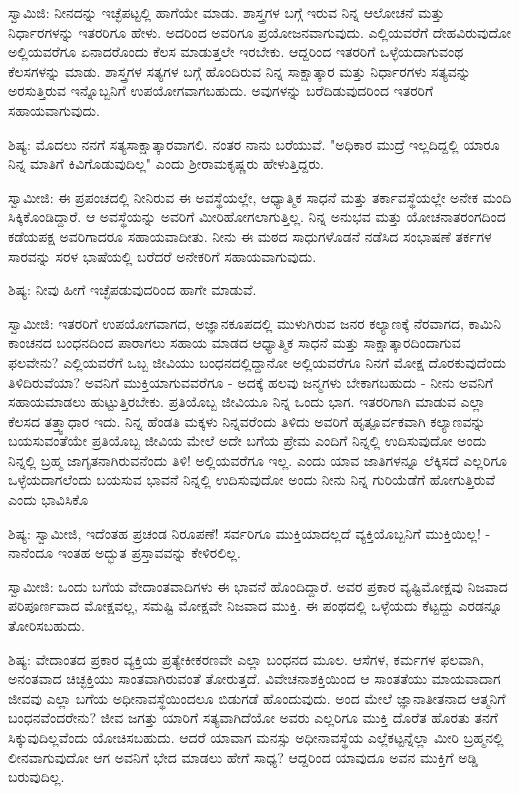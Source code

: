 ಸ್ವಾಮಿಜಿ: ನೀನದನ್ನು ಇಚ್ಛೆಪಟ್ಟಲ್ಲಿ ಹಾಗೆಯೇ ಮಾಡು. ಶಾಸ್ತ್ರಗಳ ಬಗ್ಗೆ ಇರುವ ನಿನ್ನ ಆಲೋಚನೆ ಮತ್ತು ನಿರ್ಧಾರಗಳನ್ನು ಇತರರಿಗೂ ಹೇಳು. ಅದರಿಂದ ಅವರಿಗೂ ಪ್ರಯೋಜನವಾಗುವುದು. ಎಲ್ಲಿಯವರೆಗೆ ದೇಹವಿರುವುದೋ ಅಲ್ಲಿಯವರೆಗೂ ಏನಾದರೊಂದು ಕೆಲಸ ಮಾಡುತ್ತಲೇ ಇರಬೇಕು. ಆದ್ದರಿಂದ ಇತರರಿಗೆ ಒಳ್ಳೆಯದಾಗುವಂಥ ಕೆಲಸಗಳನ್ನು ಮಾಡು. ಶಾಸ್ತ್ರಗಳ ಸತ್ಯಗಳ ಬಗ್ಗೆ ಹೊಂದಿರುವ ನಿನ್ನ ಸಾಕ್ಷಾತ್ಕಾರ ಮತ್ತು ನಿರ್ಧಾರಗಳು ಸತ್ಯವನ್ನು ಅರಸುತ್ತಿರುವ ಇನ್ನೊಬ್ಬನಿಗೆ ಉಪಯೋಗವಾಗಬಹುದು. ಅವುಗಳನ್ನು ಬರೆದಿಡುವುದರಿಂದ ಇತರರಿಗೆ ಸಹಾಯವಾಗುವುದು.

ಶಿಷ್ಯ: ಮೊದಲು ನನಗೆ ಸತ್ಯಸಾಕ್ಷಾತ್ಕಾರವಾಗಲಿ. ನಂತರ ನಾನು ಬರೆಯುವೆ. "ಅಧಿಕಾರ ಮುದ್ರೆ ಇಲ್ಲದಿದ್ದಲ್ಲಿ ಯಾರೂ ನಿನ್ನ ಮಾತಿಗೆ ಕಿವಿಗೊಡುವುದಿಲ್ಲ" ಎಂದು ಶ‍್ರೀರಾಮಕೃಷ್ಣರು ಹೇಳುತ್ತಿದ್ದರು.

ಸ್ವಾಮೀಜಿ: ಈ ಪ್ರಪಂಚದಲ್ಲಿ ನೀನಿರುವ ಈ ಅವಸ್ಥೆಯಲ್ಲೇ, ಆಧ್ಯಾತ್ಮಿಕ ಸಾಧನೆ ಮತ್ತು ತರ್ಕಾವಸ್ಥೆಯಲ್ಲೇ ಅನೇಕ ಮಂದಿ ಸಿಕ್ಕಿಕೊಂಡಿದ್ದಾರೆ. ಆ ಅವಸ್ಥೆಯನ್ನು ಅವರಿಗೆ ಮೀರಿಹೋಗಲಾಗುತ್ತಿಲ್ಲ. ನಿನ್ನ ಅನುಭವ ಮತ್ತು ಯೋಚನಾತರಂಗದಿಂದ ಕಡೆಯಪಕ್ಷ ಅವರಿಗಾದರೂ ಸಹಾಯವಾದೀತು. ನೀನು ಈ ಮಠದ ಸಾಧುಗಳೊಡನೆ ನಡೆಸಿದ ಸಂಭಾಷಣೆ ತರ್ಕಗಳ ಸಾರವನ್ನು ಸರಳ ಭಾಷೆಯಲ್ಲಿ ಬರೆದರೆ ಅನೇಕರಿಗೆ ಸಹಾಯವಾಗುವುದು.

ಶಿಷ್ಯ: ನೀವು ಹೀಗೆ ಇಚ್ಛೆಪಡುವುದರಿಂದ ಹಾಗೇ ಮಾಡುವೆ.

ಸ್ವಾಮೀಜಿ: ಇತರರಿಗೆ ಉಪಯೋಗವಾಗದ, ಅಜ್ಞಾನಕೂಪದಲ್ಲಿ ಮುಳುಗಿರುವ ಜನರ ಕಲ್ಯಾಣಕ್ಕೆ ನೆರವಾಗದ, ಕಾಮಿನಿ ಕಾಂಚನದ ಬಂಧನದಿಂದ ಪಾರಾಗಲು ಸಹಾಯ ಮಾಡದ ಆಧ್ಯಾತ್ಮಿಕ ಸಾಧನೆ ಮತ್ತು ಸಾಕ್ಷಾತ್ಕಾರದಿಂದಾಗುವ ಫಲವೇನು? ಎಲ್ಲಿಯವರೆಗೆ ಒಬ್ಬ ಜೀವಿಯು ಬಂಧನದಲ್ಲಿದ್ದಾನೋ ಅಲ್ಲಿಯವರೆಗೂ ನಿನಗೆ ಮೋಕ್ಷ ದೊರಕುವುದೆಂದು ತಿಳಿದಿರುವೆಯಾ? ಅವನಿಗೆ ಮುಕ್ತಿಯಾಗುವವರೆಗೂ - ಅದಕ್ಕೆ ಹಲವು ಜನ್ಮಗಳು ಬೇಕಾಗಬಹುದು - ನೀನು ಅವನಿಗೆ ಸಹಾಯಮಾಡಲು ಹುಟ್ಟುತ್ತಿರಬೇಕು. ಪ್ರತಿಯೊಬ್ಬ ಜೀವಿಯೂ ನಿನ್ನ ಒಂದು ಭಾಗ. ಇತರರಿಗಾಗಿ ಮಾಡುವ ಎಲ್ಲಾ ಕೆಲಸದ ತತ್ತ್ವಾಧಾರ ಇದು. ನಿನ್ನ ಹೆಂಡತಿ ಮಕ್ಕಳು ನಿನ್ನವರೆಂದು ತಿಳಿದು ಅವರಿಗೆ ಹೃತ್ಪೂರ್ವಕವಾಗಿ ಕಲ್ಯಾಣವನ್ನು ಬಯಸುವಂತೆಯೇ ಪ್ರತಿಯೊಬ್ಬ ಜೀವಿಯ ಮೇಲೆ ಅದೇ ಬಗೆಯ ಪ್ರೇಮ ಎಂದಿಗೆ ನಿನ್ನಲ್ಲಿ ಉದಿಸುವುದೋ ಅಂದು ನಿನ್ನಲ್ಲಿ ಬ್ರಹ್ಮ ಜಾಗೃತನಾಗಿರುವನೆಂದು ತಿಳಿ! ಅಲ್ಲಿಯವರೆಗೂ ಇಲ್ಲ. ಎಂದು ಯಾವ ಜಾತಿಗಳನ್ನೂ ಲೆಕ್ಕಿಸದೆ ಎಲ್ಲರಿಗೂ ಒಳ್ಳೆಯದಾಗಲೆಂದು ಬಯಸುವ ಭಾವನೆ ನಿನ್ನಲ್ಲಿ ಉದಿಸುವುದೋ ಅಂದು ನೀನು ನಿನ್ನ ಗುರಿಯೆಡೆಗೆ ಹೋಗುತ್ತಿರುವೆ ಎಂದು ಭಾವಿಸಿಕೊ

ಶಿಷ್ಯ: ಸ್ವಾಮೀಜಿ, ಇದೆಂತಹ ಪ್ರಚಂಡ ನಿರೂಪಣೆ! ಸರ್ವರಿಗೂ ಮುಕ್ತಿಯಾದಲ್ಲದೆ ವ್ಯಕ್ತಿಯೊಬ್ಬನಿಗೆ ಮುಕ್ತಿಯಿಲ್ಲ! - ನಾನೆಂದೂ ಇಂತಹ ಅದ್ಭುತ ಪ್ರಸ್ತಾವವನ್ನು ಕೇಳಿರಲಿಲ್ಲ.

ಸ್ವಾಮೀಜಿ: ಒಂದು ಬಗೆಯ ವೇದಾಂತವಾದಿಗಳು ಈ ಭಾವನೆ ಹೊಂದಿದ್ದಾರೆ. ಅವರ ಪ್ರಕಾರ ವ್ಯಷ್ಟಿಮೋಕ್ಷವು ನಿಜವಾದ ಪರಿಪೂರ್ಣವಾದ ಮೋಕ್ಷವಲ್ಲ, ಸಮಷ್ಟಿ ಮೋಕ್ಷವೇ ನಿಜವಾದ ಮುಕ್ತಿ. ಈ ಪಂಥದಲ್ಲಿ ಒಳ್ಳೆಯದು ಕೆಟ್ಟದ್ದು ಎರಡನ್ನೂ ತೋರಿಸಬಹುದು.

ಶಿಷ್ಯ: ವೇದಾಂತದ ಪ್ರಕಾರ ವ್ಯಕ್ತಿಯ ಪ್ರತ್ಯೇಕೀಕರಣವೇ ಎಲ್ಲಾ ಬಂಧನದ ಮೂಲ. ಆಸೆಗಳ, ಕರ್ಮಗಳ ಫಲವಾಗಿ, ಅನಂತವಾದ ಚಿಚ್ಛಕ್ತಿಯು ಸಾಂತವಾಗಿರುವಂತೆ ತೋರುತ್ತದೆ. ವಿವೇಚನಾಶಕ್ತಿಯಿಂದ ಆ ಸಾಂತತೆಯು ಮಾಯವಾದಾಗ ಜೀವವು ಎಲ್ಲಾ ಬಗೆಯ ಅಧೀನಾವಸ್ಥೆಯಿಂದಲೂ ಬಿಡುಗಡೆ ಹೊಂದುವುದು. ಅಂದ ಮೇಲೆ ಜ್ಞಾನಾತೀತನಾದ ಆತ್ಮನಿಗೆ ಬಂಧನವೆಂದರೇನು? ಜೀವ ಜಗತ್ತು ಯಾರಿಗೆ ಸತ್ಯವಾಗಿದೆಯೋ ಅವರು ಎಲ್ಲರಿಗೂ ಮುಕ್ತಿ ದೊರೆತ ಹೊರತು ತನಗೆ ಸಿಕ್ಕುವುದಿಲ್ಲವೆಂದು ಯೋಚಿಸಬಹುದು. ಆದರೆ ಯಾವಾಗ ಮನಸ್ಸು ಅಧೀನಾವಸ್ಥೆಯ ಎಲ್ಲೆಕಟ್ಟನ್ನೆಲ್ಲಾ ಮೀರಿ ಬ್ರಹ್ಮನಲ್ಲಿ ಲೀನವಾಗುವುದೋ ಆಗ ಅವನಿಗೆ ಭೇದ ಮಾಡಲು ಹೇಗೆ ಸಾಧ್ಯ? ಆದ್ದರಿಂದ ಯಾವುದೂ ಅವನ ಮುಕ್ತಿಗೆ ಅಡ್ಡಿ ಬರುವುದಿಲ್ಲ.

